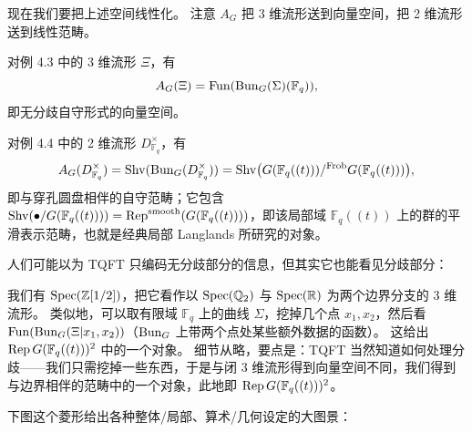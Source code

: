 现在我们要把上述空间线性化。
注意 $A_G$ 把 3 维流形送到向量空间，把 2 维流形送到线性范畴。

\begin{exmp}
对例 4.3 中的 3 维流形 $\Xi$，有
\[
  A_G(\Xi)=\operatorname{Fun}(\operatorname{Bun}_G(\Sigma)(\mathbb F_q)),
\]
即无分歧自守形式的向量空间。
\end{exmp}

\begin{exmp}
对例 4.4 中的 2 维流形 $D^\times_{\mathbb F_q}$，有
\[
  A_G(D^\times_{\mathbb F_q})=\operatorname{Shv}(\operatorname{Bun}_G(D^\times_{\mathbb F_q}))
  =\operatorname{Shv}\bigl(G(\mathbb F_q((t)))/^{\operatorname{Frob}}G(\mathbb F_q((t)))\bigr),
\]
即与穿孔圆盘相伴的自守范畴；它包含 $\operatorname{Shv}(\bullet/G(\mathbb F_q((t))))=\operatorname{Rep}^{\mathrm{smooth}}(G(\mathbb F_q((t))))$，即该局部域 $\mathbb F_q((t))$ 上的群的平滑表示范畴，也就是经典局部 Langlands 所研究的对象。
\end{exmp}

\begin{exmp}
人们可能以为 TQFT 只编码无分歧部分的信息，但其实它也能看见分歧部分：


我们有 $\operatorname{Spec}(\mathbb Z[1/2])$，把它看作以 $\operatorname{Spec}(\mathbb Q_2)$ 与 $\operatorname{Spec}(\mathbb R)$ 为两个边界分支的 3 维流形。
类似地，可以取有限域 $\mathbb F_q$ 上的曲线 $\Sigma$，挖掉几个点 $x_1,x_2$，然后看 $\operatorname{Fun}(\operatorname{Bun}_G(\Xi|x_1,x_2))$（$\operatorname{Bun}_G$ 上带两个点处某些额外数据的函数）。
这给出 $\operatorname{Rep} G(\mathbb F_q((t)))^2$ 中的一个对象。
细节从略，要点是：TQFT 当然知道如何处理分歧——我们只需挖掉一些东西，于是与闭 3 维流形得到向量空间不同，我们得到与边界相伴的范畴中的一个对象，此地即 $\operatorname{Rep} G(\mathbb F_q((t)))^2$。
\end{exmp}

下图这个菱形给出各种整体/局部、算术/几何设定的大图景：
\begin{center}
\end{center}

